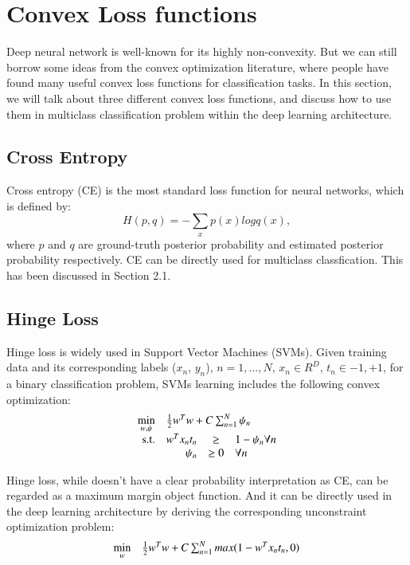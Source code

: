 \documentclass{article} %
\begin{document}
\section{Convex Loss functions}
Deep neural network is well-known for its highly non-convexity. But we can still borrow some ideas from the convex optimization literature, where people have found many useful convex loss functions for classification tasks. In this section, we will talk about three different convex loss functions, and discuss how to use them in multiclass classification problem within the deep learning architecture.


\subsection{Cross Entropy}
Cross entropy (CE) is the most standard loss function for neural networks, which is defined by:
\begin{equation}
H(p,q) = - \sum_{x}p(x)log q(x),
\end{equation}
where $p$ and $q$ are ground-truth posterior probability and estimated posterior probability respectively. CE can be directly used for multiclass classfication. This has been discussed in Section 2.1. 

\subsection{Hinge Loss}
Hinge loss is widely used in Support Vector Machines (SVMs). Given training data and its corresponding labels ($x_{n}$, $y_{n}$), $n=1,...,N$, $x_{n} \in R^{D}$, $t_{n} \in {-1,+1}$, for a binary classification problem, SVMs learning includes the following convex optimization:
\begin{equation}
\begin{array}{rrclcl}
\displaystyle \min_{w,\psi} & \multicolumn{3}{l}{ \frac{1}{2} w^{T}w +   C\sum_{n=1}^{N}\psi_{n}}\\
\textrm{s.t.} & w^{T}x_{n}t_{n}& \geq & 1-\psi_{n}  \forall n\\
&\psi_{n} & \geq 0& \forall n \\
\end{array}
\end{equation}

Hinge loss, while doesn't have a clear probability interpretation as CE, can be regarded as a maximum margin object function. And it can be directly used in the deep learning architecture by deriving the corresponding unconstraint optimization problem:
\begin{equation}
\begin{array}{rrclcl}
\displaystyle \min_{w} & \multicolumn{3}{l}{ \frac{1}{2}w^{T}w+C\sum_{n=1}^{N}max(1-w^{T}x_{n}t_{n},0)}\\






\end{array}
\end{equation}
\end{document}
